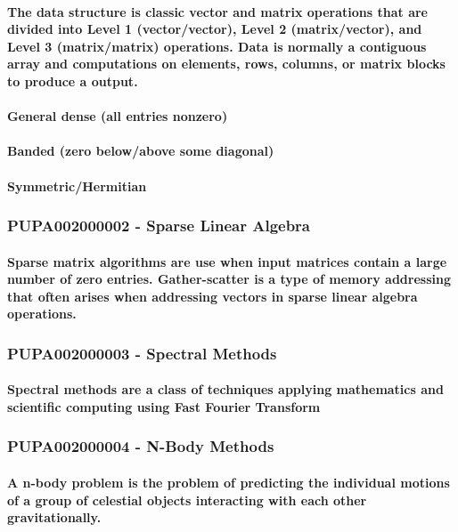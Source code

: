\documentclass{acm_proc_article-sp}
\begin{document}
\paragraph{The data structure is classic vector and matrix operations that are divided into Level 1 (vector/vector), Level 2 (matrix/vector), and Level 3 (matrix/matrix) operations. Data is normally a contiguous array and computations on elements, rows, columns, or matrix blocks to produce a output.}
\paragraph{General dense (all entries nonzero)}
\paragraph{Banded (zero below/above some diagonal)}
\paragraph{Symmetric/Hermitian}
\subsubsection{PUPA002000002 - Sparse Linear Algebra}
\paragraph{Sparse matrix algorithms are use when input matrices contain a large number of zero entries. Gather-scatter is a type of memory addressing that often arises when addressing vectors in sparse linear algebra operations.}
\subsubsection{PUPA002000003 - Spectral Methods}
\paragraph{Spectral methods are a class of techniques applying mathematics and scientific computing using Fast Fourier Transform}
\subsubsection{PUPA002000004 - N-Body Methods}
\paragraph{A n-body problem is the problem of predicting the individual motions of a group of celestial objects interacting with each other gravitationally.}
\end{document}
